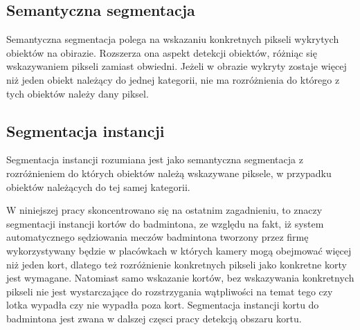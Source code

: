 \subsection*{Semantyczna segmentacja}
Semantyczna segmentacja polega na wskazaniu konkretnych pikseli wykrytych obiektów na obirazie. Rozszerza ona aspekt detekcji obiektów, różniąc się wskazywaniem pikseli zamiast obwiedni. Jeżeli w obrazie wykryty zostaje więcej niż jeden obiekt należący do jednej kategorii, nie ma rozróżnienia do którego z tych obiektów należy dany piksel.
\subsection*{Segmentacja instancji}
Segmentacja instancji rozumiana jest jako semantyczna segmentacja z rozróżnieniem do których obiektów należą wskazywane piksele, w przypadku obiektów należących do tej samej kategorii.

W niniejszej pracy skoncentrowano się na ostatnim zagadnieniu,  to znaczy segmentacji instancji kortów do badmintona, ze względu na fakt, iż system automatycznego sędziowania meczów badmintona tworzony przez firmę \blue{} wykorzystywany będzie w placówkach w których kamery mogą obejmować więcej niż jeden kort, dlatego też rozróżnienie konkretnych pikseli jako konkretne korty jest wymagane. Natomiast samo wskazanie kortów, bez wskazywania konkretnych pikseli nie jest wystarczające do rozstrzygania wątpliwości na temat tego czy lotka wypadła czy nie wypadła poza kort. Segmentacja instancji kortu do badmintona jest zwana w dalszej częsci pracy detekcją obszaru kortu.

